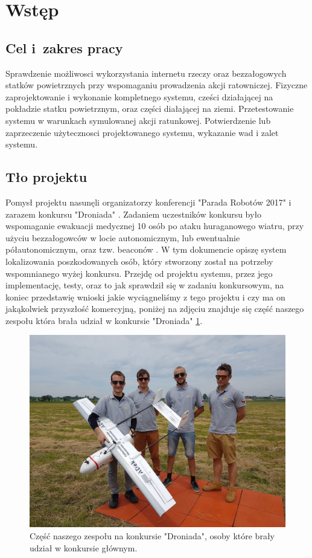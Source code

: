 \section{Wstęp}
\suppressfloats[t]  %
\subsection{Cel i~zakres pracy}
Sprawdzenie możliwosci wykorzystania internetu rzeczy oraz bezzałogowych statków powietrznych przy wspomaganiu prowadzenia akcji ratowniczej. Fizyczne zaprojektowanie i wykonanie kompletnego systemu, cześci działającej na pokładzie statku powietrznym, oraz części diałającej na ziemi. Przetestowanie systemu w warunkach symulowanej akcji ratunkowej. Potwierdzenie lub zaprzeczenie użytecznosci projektowanego systemu, wykazanie wad i zalet systemu.
\subsection{Tło projektu}
Pomysł projektu nasunęli organizatorzy konferencji "Parada Robotów 2017" i zarazem konkursu "Droniada" \cite{droniada}. Zadaniem uczestników konkursu było wspomaganie ewakuacji medycznej 10 osób po ataku huraganowego wiatru, przy użyciu bezzałogowców w locie autonomicznym, lub ewentualnie półautonomicznym, oraz tzw. beaconów \cite{beacon}. W tym dokumencie opiszę system lokalizowania poszkodowanych osób, który stworzony został na potrzeby wspomnianego wyżej konkursu. Przejdę od projektu systemu, przez jego implementację, testy, oraz to jak sprawdził się w zadaniu konkursowym, na koniec przedstawię wnioski jakie wyciągneliśmy z tego projektu i czy ma on jakąkolwiek przyszłość komercyjną, poniżej na zdjęciu znajduje się część naszego zespołu która brała udział w konkursie "Droniada" \ref{fig:zespoldroniada}.

\begin{figure}[!th]
    \centering
    \includegraphics[width=15cm]{zalaczniki/obrazy/droniada.jpg}
    \caption{Część naszego zespołu na konkursie "Droniada", osoby które brały udział w konkursie głównym.}
    \label{fig:zespoldroniada}
\end{figure}

